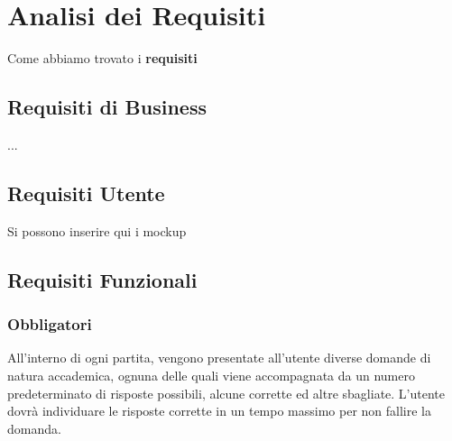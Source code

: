 

\chapter{Analisi dei Requisiti}
Come abbiamo trovato i \textbf{requisiti}
	\section{Requisiti di Business}
	...
	
	\section{Requisiti Utente}
	Si possono inserire qui i mockup
	    
	\section{Requisiti Funzionali} 
        \subsection{Obbligatori}
        All’interno di ogni partita, vengono presentate all’utente diverse domande di natura accademica, ognuna delle quali viene accompagnata da un numero predeterminato di risposte possibili, alcune corrette ed altre sbagliate. L’utente dovrà individuare le risposte corrette in un tempo massimo per non fallire la domanda. 


